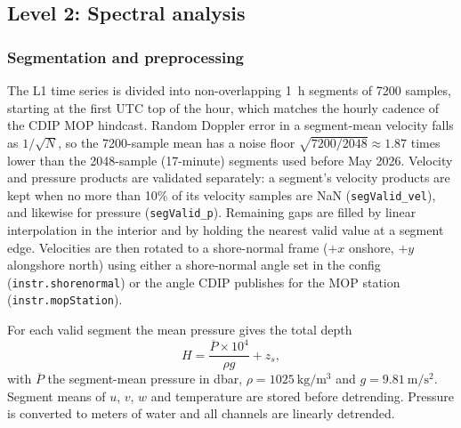 \subsection{Level 2: Spectral analysis}

\subsubsection{Segmentation and preprocessing}

The L1 time series is divided into non-overlapping \SI{1}{\hour} segments of 7200
samples, starting at the first UTC top of the hour, which matches the hourly
cadence of the CDIP MOP hindcast. Random Doppler error in a segment-mean velocity
falls as $1/\sqrt{N}$, so the 7200-sample mean has a noise floor
$\sqrt{7200/2048} \approx 1.87$ times lower than the 2048-sample (17-minute)
segments used before May 2026. Velocity and pressure products are validated
separately: a segment's velocity products are kept when no more than 10\% of its
velocity samples are NaN (\texttt{segValid\_vel}), and likewise for pressure
(\texttt{segValid\_p}). Remaining gaps are filled by linear interpolation in the
interior and by holding the nearest valid value at a segment edge. Velocities
are then rotated to a shore-normal frame ($+x$ onshore, $+y$ alongshore north)
using either a shore-normal angle set in the config (\texttt{instr.shorenormal})
or the angle CDIP publishes for the MOP station (\texttt{instr.mopStation}).


For each valid segment the mean pressure gives the total depth
\begin{equation}
  H = \frac{\overline{P} \times 10^4}{\rho g} + z_s ,
  \label{eq:depth}
\end{equation}
with $\overline{P}$ the segment-mean pressure in dbar,
$\rho = \SI{1025}{\kilogram\per\meter\cubed}$ and
$g = \SI{9.81}{\meter\per\second\squared}$. Segment means of $u$, $v$, $w$ and
temperature are stored before detrending. Pressure is converted to meters of
water and all channels are linearly detrended.

